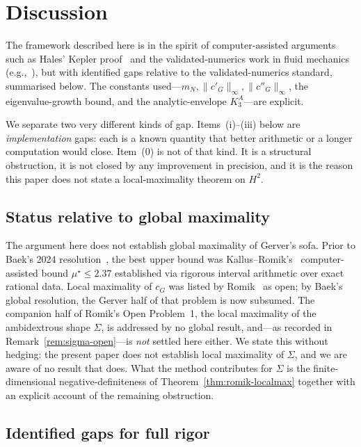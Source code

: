\documentclass[11pt]{amsart}
\theoremstyle{plain}
\theoremstyle{definition}
\newcommand{\cG}{c_{G}}
\begin{document}
\section{Discussion}\label{sec:discussion}

The framework described here is in the spirit of computer-assisted
arguments such as Hales' Kepler proof~\cite{Hales} and the
validated-numerics work in fluid mechanics
(e.g.,~\cite{Lord,Castelli}), but with identified gaps
relative to the validated-numerics standard, summarised below.
The constants used---$m_{N}, \|c'_{G}\|_{\infty},
\|c''_{G}\|_{\infty}$, the eigenvalue-growth bound, and the
analytic-envelope $K_{3}^{A}$---are explicit.

We separate two very different kinds of gap.  Items~(i)--(iii) below
are \emph{implementation} gaps: each is a known quantity that better
arithmetic or a longer computation would close.  Item~(0) is not of
that kind.  It is a structural obstruction, it is not closed by any
improvement in precision, and it is the reason this paper does not
state a local-maximality theorem on $H^{2}$.

\subsection*{Status relative to global maximality}

The argument here does not establish global maximality of
Gerver's sofa.  Prior to Baek's 2024 resolution~\cite{Baek2024},
the best upper bound was
Kallus--Romik's~\cite{KallusRomik2018} computer-assisted bound
$\mu^{\star} \leq 2.37$ established via rigorous interval
arithmetic over exact rational data.  Local maximality of $\cG$ was
listed by Romik~\cite[\S7, Open Problem 1]{Romik2018} as open;
by Baek's global resolution, the Gerver half of that
problem is now subsumed.  The companion half of Romik's Open
Problem~1, the local maximality of the ambidextrous shape $\Sigma$,
is addressed by no global result, and---as recorded in
Remark~\ref{rem:sigma-open}---is \emph{not} settled here either.  We
state this without hedging: the present paper does not establish
local maximality of $\Sigma$, and we are aware of no result that
does.  What the method contributes for $\Sigma$ is the
finite-dimensional negative-definiteness of
Theorem~\ref{thm:romik-localmax} together with an explicit account of
the remaining obstruction.

\subsection*{Identified gaps for full rigor}
\end{document}
